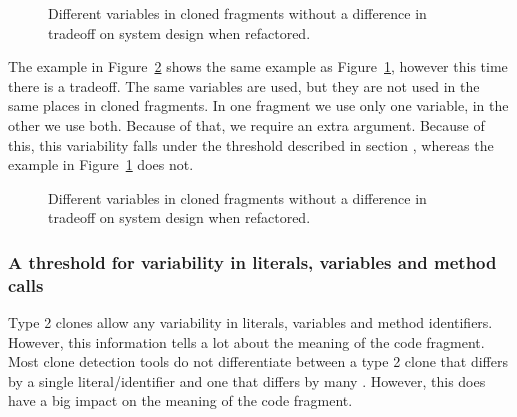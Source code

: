 \begin{figure}[H]
\begin{parcolumns}{2}
\end{parcolumns}
\caption{Different variables in cloned fragments without a difference in tradeoff on system design when refactored.}
\label{fig:type2variablerefactoringnotradeoff}
\end{figure}

The example in Figure~\ref{fig:type2variablerefactoringwithtradeoff} shows the same example as Figure~\ref{fig:type2variablerefactoringnotradeoff}, however this time there is a tradeoff. The same variables are used, but they are not used in the same places in cloned fragments. In one fragment we use only one variable, in the other we use both. Because of that, we require an extra argument. Because of this, this variability falls under the threshold described in section \label{sec:variabilitythreshold}, whereas the example in Figure~\ref{fig:type2variablerefactoringnotradeoff} does not.

\begin{figure}[H]
\begin{parcolumns}{2}
\end{parcolumns}
\caption{Different variables in cloned fragments without a difference in tradeoff on system design when refactored.}
\label{fig:type2variablerefactoringwithtradeoff}
\end{figure}

\subsubsection{A threshold for variability in literals, variables and method calls}\label{sec:variabilitythreshold}
Type 2 clones allow any variability in literals, variables and method identifiers. However, this information tells a lot about the meaning of the code fragment. Most clone detection tools do not differentiate between a type 2 clone that differs by a single literal/identifier and one that differs by many \cite{roy2009comparison}. However, this does have a big impact on the meaning of the code fragment.

